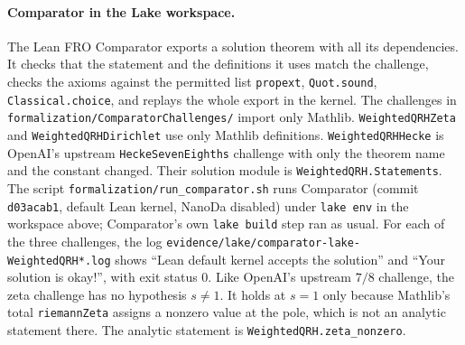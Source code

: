 \documentclass[11pt]{article}
\begin{document}
\paragraph{Comparator in the Lake workspace.}
The Lean FRO Comparator \cite{comparator} exports a solution theorem with
all its dependencies. It checks that the statement and the definitions it
uses match the challenge, checks the axioms against the permitted list
\nolinkurl{propext}, \nolinkurl{Quot.sound}, \nolinkurl{Classical.choice},
and replays the whole export in the kernel. The challenges in
\nolinkurl{formalization/ComparatorChallenges/} import only Mathlib.
\nolinkurl{WeightedQRHZeta} and \nolinkurl{WeightedQRHDirichlet} use only
Mathlib definitions. \nolinkurl{WeightedQRHHecke} is OpenAI's upstream
\nolinkurl{HeckeSevenEighths} challenge with only the theorem name and the
constant changed. Their solution module is
\nolinkurl{WeightedQRH.Statements}. The script
\nolinkurl{formalization/run_comparator.sh} runs Comparator (commit
\nolinkurl{d03acab1}, default Lean kernel, NanoDa disabled) under
\texttt{lake env} in the workspace above; Comparator's own
\texttt{lake build} step ran as usual. For each of the three challenges,
the log \nolinkurl{evidence/lake/comparator-lake-WeightedQRH*.log} shows
``Lean default kernel accepts the solution'' and ``Your solution is
okay!'', with exit status 0. Like OpenAI's upstream $7/8$ challenge, the
zeta challenge has no hypothesis $s\ne1$. It holds at $s=1$ only because
Mathlib's total \nolinkurl{riemannZeta} assigns a nonzero value at the
pole, which is not an analytic statement there. The analytic statement is
\nolinkurl{WeightedQRH.zeta_nonzero}.
\end{document}
